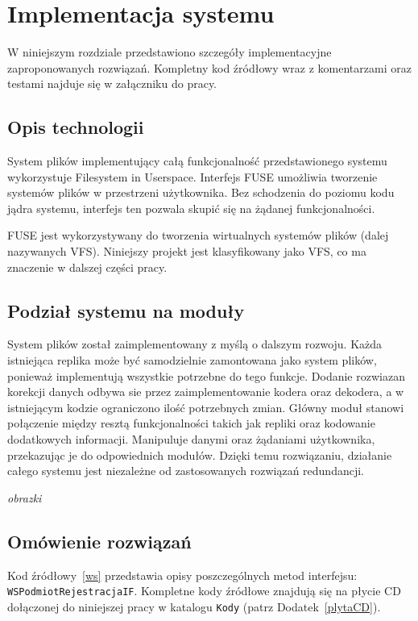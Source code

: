 \chapter{Implementacja systemu}
\thispagestyle{chapterBeginStyle}
W niniejszym rozdziale przedstawiono szczegóły implementacyjne zaproponowanych rozwiązań. Kompletny kod źródłowy wraz z komentarzami oraz testami najduje się w załączniku do pracy.

\section{Opis technologii}

System plików implementujący całą funkcjonalność przedstawionego systemu wykorzystuje Filesystem in Userspace. Interfejs FUSE umożliwia tworzenie systemów plików w przestrzeni użytkownika. Bez schodzenia do poziomu kodu jądra systemu, interfejs ten pozwala skupić się na żądanej funkcjonalności.

FUSE jest wykorzystywany do tworzenia wirtualnych systemów plików (dalej nazywanych VFS). Niniejszy projekt jest klasyfikowany jako VFS, co ma znaczenie w dalszej części pracy.

\section{Podział systemu na moduły}
System plików został zaimplementowany z myślą o dalszym rozwoju. Każda istniejąca replika może być samodzielnie zamontowana jako system plików, ponieważ implementują wszystkie potrzebne do tego funkcje. Dodanie rozwiazan korekcji danych odbywa sie przez zaimplementowanie kodera oraz dekodera, a w istniejącym kodzie ograniczono ilość potrzebnych zmian. Główny moduł stanowi połączenie między resztą funkcjonalności takich jak repliki oraz kodowanie dodatkowych informacji. Manipuluje danymi oraz żądaniami użytkownika, przekazując je do odpowiednich modułów. Dzięki temu rozwiązaniu, działanie całego systemu jest niezależne od zastosowanych rozwiązań redundancji.

\textit{obrazki}

\section{Omówienie rozwiązań}

{\color{dgray}
Kod źródłowy~\ref{ws} przedstawia opisy poszczególnych metod interfejsu: \texttt{WSPodmiotRejestracjaIF}. Kompletne
kody źródłowe znajdują się na płycie CD dołączonej do niniejszej pracy w katalogu \texttt{Kody} (patrz Dodatek~\ref{plytaCD}).
}
